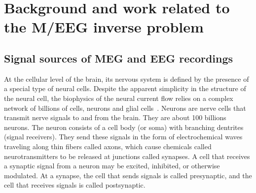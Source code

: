 
\chapter{Background and work related to the M/EEG inverse problem} %
\label{chapter:background} %
\noindent\makebox[\linewidth]{\rule{0.75\paperwidth}{0.4pt}}
\noindent\makebox[\linewidth]{\rule{0.75\paperwidth}{0.4pt}}

\localtableofcontents %

\noindent\makebox[\linewidth]{\rule{0.75\paperwidth}{0.4pt}}
\noindent\makebox[\linewidth]{\rule{0.75\paperwidth}{0.4pt}}

\newpage

\newcommand{\keyword}[1]{\textbf{#1}}
\newcommand{\tabhead}[1]{\textbf{#1}}
\newcommand{\code}[1]{\texttt{#1}}
\newcommand{\file}[1]{\texttt{\bfseries#1}}
\newcommand{\option}[1]{\texttt{\itshape#1}}


\section{Signal sources of MEG and EEG recordings}
At the cellular level of the brain, its nervous system is defined by the presence of a special type of neural cells. Despite the apparent simplicity in the structure of the neural cell, the biophysics of the neural current flow relies on a complex network of billions of cells, neurons and glial cells~\cite{baillet2001electromagnetic, hodgkin1964conduction}. Neurons are nerve cells that transmit nerve signals to and from the brain. They are about 100 billions neurons. The neuron consists of a cell body (or soma) with branching dentrites (signal receivers). They send these signals in the form of electrochemical waves traveling along thin fibers called axons, which cause chemicals called neurotransmitters to be released at junctions called synapses. A cell that receives a synaptic signal from a neuron may be excited, inhibited, or otherwise modulated. At a synapse, the cell that sends signals is called presynaptic, and the cell that receives signals is called postsynaptic.\\

